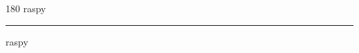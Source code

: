 
\begin{frame}
\begin{center}
\begin{turn}{180}
{\fontsize{2.5cm}{1em}\selectfont raspy}
\end{turn}
\vspace{1em}\par  
\hrule
\vspace{1em}\par  
{\fontsize{2.5cm}{1em}\selectfont raspy}
\end{center}
\end{frame}
